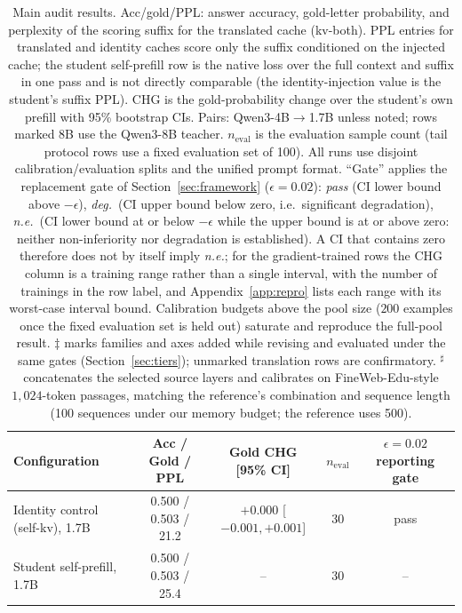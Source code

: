 \documentclass[10pt]{article}
\begin{document}
\begin{table}[t]
\centering
\caption{Main audit results. Acc/gold/PPL: answer accuracy,
gold-letter probability, and perplexity of the scoring suffix for
the translated cache (kv-both). PPL entries for translated and identity
caches score only the suffix conditioned on the injected cache; the student
self-prefill row is the native loss over the full context and suffix in one
pass and is not directly comparable (the identity-injection value is the
student's suffix PPL). CHG is the gold-probability change
over the student's own prefill with 95\% bootstrap CIs. Pairs:
Qwen3-4B$\to$1.7B unless noted; rows marked 8B use the Qwen3-8B
teacher. $n_{\mathrm{eval}}$ is the evaluation sample count (tail
protocol rows use a fixed evaluation set of 100). All runs use
disjoint calibration/evaluation splits and the unified prompt
format. ``Gate'' applies the replacement gate of
Section~\ref{sec:framework} ($\epsilon{=}0.02$): \emph{pass} (CI lower bound
above $-\epsilon$), \emph{deg.}\ (CI upper bound below zero, i.e.\ significant
degradation), \emph{n.e.}\ (CI lower bound at or below $-\epsilon$ while the
upper bound is at or above zero: neither non-inferiority nor degradation is
established). A CI that contains zero therefore does not by itself imply
\emph{n.e.}; for the gradient-trained rows the CHG column is a training range
rather than a single interval, with the number of trainings in the row label,
and Appendix~\ref{app:repro} lists each range with its worst-case interval
bound. Calibration budgets above the pool size ($200$
examples once the fixed evaluation set is held out) saturate and reproduce the
full-pool result.
$\ddagger$ marks families and axes added while revising and evaluated under the
same gates (Section~\ref{sec:tiers}); unmarked translation rows are
confirmatory. $^{\sharp}$ concatenates the selected source layers and
calibrates on FineWeb-Edu-style $1{,}024$-token passages, matching the
reference's combination and sequence length (100 sequences under our
memory budget; the reference uses 500).}
\label{tab:main}
\footnotesize
\setlength{\tabcolsep}{4pt}
\begin{tabular}{lcccc}
\toprule
Configuration & Acc / Gold / PPL & Gold CHG [95\% CI] & $n_{\mathrm{eval}}$ & $\epsilon{=}0.02$ reporting gate \\
\midrule
Identity control (self-kv), 1.7B & 0.500 / 0.503 / 21.2 & $+0.000$ [$-0.001, +0.001$] & 30 & pass \\
Student self-prefill, 1.7B & 0.500 / 0.503 / 25.4 & -- & 30 & -- \\

\end{tabular}
\end{table}
\end{document}
